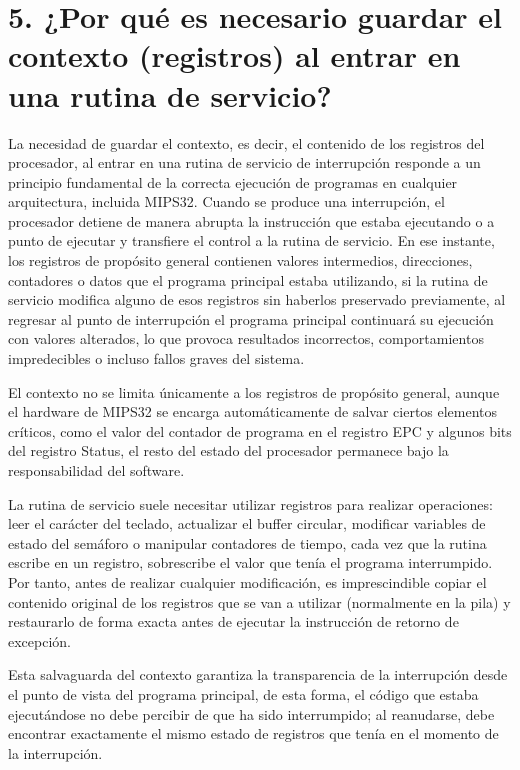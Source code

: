 \documentclass[12pt, letterpaper]{article}
\begin{document}
\section*{\textbf{\textbf{5. ¿Por qué es necesario guardar el contexto (registros) al entrar en una rutina de servicio? }}}

La necesidad de guardar el contexto, es decir, el contenido de los registros del procesador, al entrar en una rutina de servicio de interrupción responde a un principio fundamental de la correcta ejecución de programas en cualquier arquitectura, incluida MIPS32. Cuando se produce una interrupción, el procesador detiene de manera abrupta la instrucción que estaba ejecutando o a punto de ejecutar y transfiere el control a la rutina de servicio. En ese instante, los registros de propósito general contienen valores intermedios, direcciones, contadores o datos que el programa principal estaba utilizando, si la rutina de servicio modifica alguno de esos registros sin haberlos preservado previamente, al regresar al punto de interrupción el programa principal continuará su ejecución con valores alterados, lo que provoca resultados incorrectos, comportamientos impredecibles o incluso fallos graves del sistema.

El contexto no se limita únicamente a los registros de propósito general, aunque el hardware de MIPS32 se encarga automáticamente de salvar ciertos elementos críticos, como el valor del contador de programa en el registro EPC y algunos bits del registro Status, el resto del estado del procesador permanece bajo la responsabilidad del software.

La rutina de servicio suele necesitar utilizar registros para realizar operaciones: leer el carácter del teclado, actualizar el buffer circular, modificar variables de estado del semáforo o manipular contadores de tiempo, cada vez que la rutina escribe en un registro, sobrescribe el valor que tenía el programa interrumpido. Por tanto, antes de realizar cualquier modificación, es imprescindible copiar el contenido original de los registros que se van a utilizar (normalmente en la pila) y restaurarlo de forma exacta antes de ejecutar la instrucción de retorno de excepción.

Esta salvaguarda del contexto garantiza la transparencia de la interrupción desde el punto de vista del programa principal, de esta forma, el código que estaba ejecutándose no debe percibir de que ha sido interrumpido; al reanudarse, debe encontrar exactamente el mismo estado de registros que tenía en el momento de la interrupción. 
\end{document}
